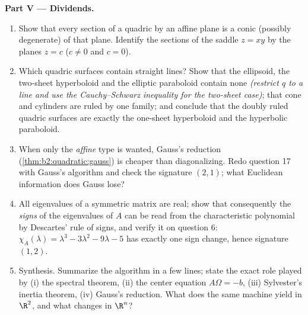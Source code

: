 \begin{problem}
\medskip
\noindent\textbf{Part V --- Dividends.}
\begin{enumerate}[resume]
  \item Show that every section of a quadric by an affine
        plane is a conic (possibly degenerate) of that plane.
        Identify the sections of the saddle $z = xy$ by the
        planes $z = c$ ($c \neq 0$ and $c = 0$).
  \item Which quadric surfaces contain straight lines? Show
        that the ellipsoid, the two-sheet hyperboloid and the
        elliptic paraboloid contain none \emph{(restrict $q$
        to a line and use the Cauchy--Schwarz inequality for
        the two-sheet case)}; that cone and cylinders are
        ruled by one family; and conclude that the doubly
        ruled quadric surfaces are exactly the one-sheet
        hyperboloid and the hyperbolic paraboloid.
  \item When only the \emph{affine} type is wanted, Gauss's
        reduction (\cref{thm:b2:quadratic:gauss}) is cheaper
        than diagonalizing. Redo question 17 with Gauss's
        algorithm and check the signature $(2, 1)$; what
        Euclidean information does Gauss lose?
  \item All eigenvalues of a symmetric matrix are real; show
        that consequently the \emph{signs} of the eigenvalues
        of $A$ can be read from the characteristic polynomial
        by Descartes' rule of signs, and verify it on
        question 6: $\chi_A(\lambda) = \lambda^3 - 3\lambda^2
        - 9\lambda - 5$ has exactly one sign change, hence
        signature $(1, 2)$.
  \item Synthesis. Summarize the algorithm in a few lines;
        state the exact role played by (i) the spectral
        theorem, (ii) the center equation $A\Omega = -b$,
        (iii) Sylvester's inertia theorem, (iv) Gauss's
        reduction. What does the same machine yield in
        $\R^2$, and what changes in $\R^n$?
\end{enumerate}
\end{problem}
